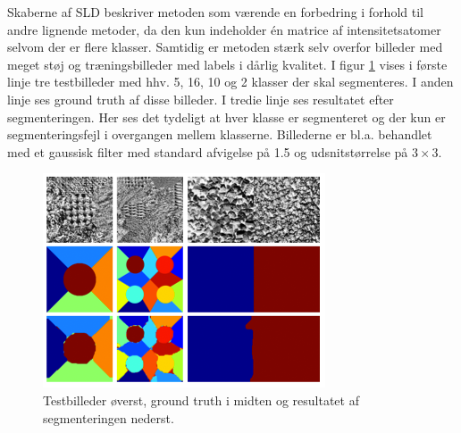 Skaberne af SLD beskriver metoden som værende en forbedring i forhold til andre lignende metoder, da den kun indeholder én matrice af intensitetsatomer selvom der er flere klasser. Samtidig er metoden stærk selv overfor billeder med meget støj og træningsbilleder med labels i dårlig kvalitet. I figur \ref{fig:postmethod_sld_testing} vises i første linje tre testbilleder med hhv. 5, 16, 10 og 2 klasser der skal segmenteres. I anden linje ses ground truth af disse billeder. I tredie linje ses resultatet efter segmenteringen. Her ses det tydeligt at hver klasse er segmenteret og der kun er segmenteringsfejl i overgangen mellem klasserne. Billederne er bl.a. behandlet med et gaussisk filter med standard afvigelse på 1.5 og udsnitstørrelse på $3\times3$.

\begin{figure}[H]
		\centering
		\includegraphics[scale=1]{files/postmethod/img/dict_6.png}
	\caption{Testbilleder øverst, ground truth i midten og resultatet af segmenteringen nederst.\label{fig:postmethod_sld_testing}}
\end{figure}

